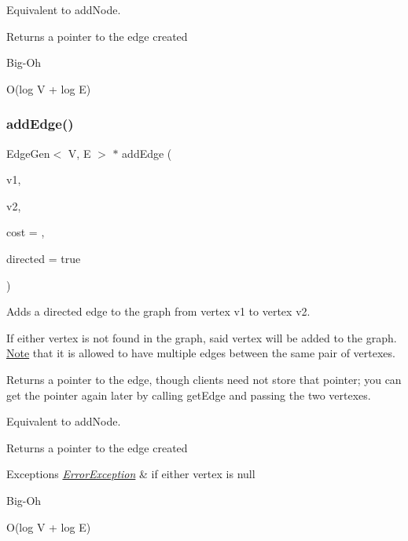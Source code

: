 Equivalent to add\+Node.

\begin{DoxyReturn}{Returns}
a pointer to the edge created 
\end{DoxyReturn}
\begin{DoxyRefDesc}{Big-\/\+Oh}
\item[\mbox{\hyperlink{BigOh__BigOh000003}{Big-\/\+Oh}}]O(log V + log E) \end{DoxyRefDesc}
\mbox{\label{classBasicGraphGen_ac2fe8fab4722e89853df8ed385aa7a26}} 
\subsubsection{\texorpdfstring{add\+Edge()}{addEdge()}\hspace{0.1cm}{\footnotesize\ttfamily [2/3]}}
{\footnotesize\ttfamily Edge\+Gen$<$ V, E $>$ $\ast$ add\+Edge (\begin{DoxyParamCaption}\item[{\mbox{\hyperlink{classVertexGen}{Vertex\+Gen}}$<$ V, E $>$ $\ast$}]{v1,  }\item[{\mbox{\hyperlink{classVertexGen}{Vertex\+Gen}}$<$ V, E $>$ $\ast$}]{v2,  }\item[{double}]{cost = {},  }\item[{bool}]{directed = {\ttfamily true} }\end{DoxyParamCaption})}



Adds a directed edge to the graph from vertex v1 to vertex v2. 

If either vertex is not found in the graph, said vertex will be added to the graph. \mbox{\hyperlink{classNote}{Note}} that it is allowed to have multiple edges between the same pair of vertexes.

Returns a pointer to the edge, though clients need not store that pointer; you can get the pointer again later by calling get\+Edge and passing the two vertexes.

Equivalent to add\+Node.

\begin{DoxyReturn}{Returns}
a pointer to the edge created 
\end{DoxyReturn}

\begin{DoxyExceptions}{Exceptions}
{\em \mbox{\hyperlink{classErrorException}{Error\+Exception}}} & if either vertex is null \\
\hline
\end{DoxyExceptions}
\begin{DoxyRefDesc}{Big-\/\+Oh}
\item[\mbox{\hyperlink{BigOh__BigOh000004}{Big-\/\+Oh}}]O(log V + log E) \end{DoxyRefDesc}
\mbox{\label{classBasicGraphGen_a92cffe0dd5b70ab78a3bce486fd60637}} 
